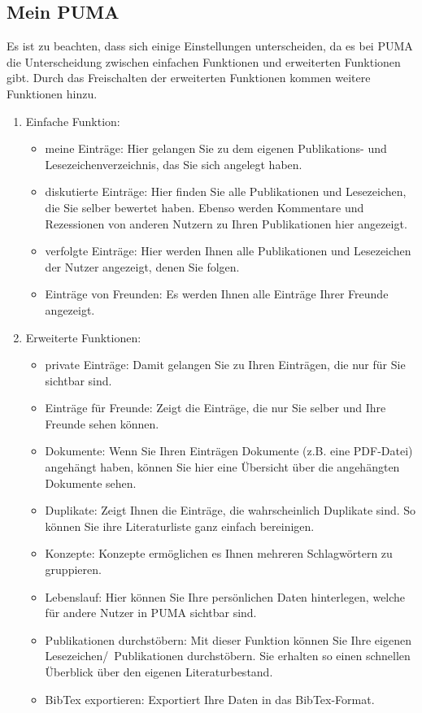 \subsection{Mein PUMA}
Es ist zu beachten, dass sich einige Einstellungen unterscheiden, da es bei PUMA die Unterscheidung zwischen einfachen Funktionen und erweiterten Funktionen gibt. Durch das Freischalten der erweiterten Funktionen kommen weitere Funktionen hinzu.
\begin{enumerate}
    \item Einfache Funktion:
    \begin{itemize}
        \item meine Einträge: Hier gelangen Sie zu dem eigenen Publikations- und Lesezeichenverzeichnis, das Sie sich angelegt haben.
        \item diskutierte Einträge: Hier finden Sie alle Publikationen und Lesezeichen, die Sie selber bewertet haben. Ebenso werden Kommentare und Rezessionen von anderen Nutzern zu Ihren Publikationen hier angezeigt.
        \item verfolgte Einträge: Hier werden Ihnen alle Publikationen und Lesezeichen der Nutzer angezeigt, denen Sie folgen.
        \item Einträge von Freunden: Es werden Ihnen alle Einträge Ihrer Freunde angezeigt.
    \end{itemize}
    \item Erweiterte Funktionen:
    \begin{itemize}
        \item private Einträge: Damit gelangen Sie zu Ihren Einträgen, die nur für Sie sichtbar sind. 
        \item Einträge für Freunde: Zeigt die Einträge, die nur Sie selber und Ihre Freunde sehen können.
        \item Dokumente: Wenn Sie Ihren Einträgen Dokumente (z.B. eine PDF-Datei) angehängt haben, können Sie hier eine Übersicht über die angehängten Dokumente sehen.
        \item Duplikate: Zeigt Ihnen die Einträge, die wahrscheinlich Duplikate sind. So können Sie ihre Literaturliste ganz einfach bereinigen. 
        \item Konzepte: Konzepte ermöglichen es Ihnen mehreren Schlagwörtern zu gruppieren. 
        \item Lebenslauf: Hier können Sie Ihre persönlichen Daten hinterlegen, welche für andere Nutzer in PUMA sichtbar sind.
        \item Publikationen durchstöbern: Mit dieser Funktion können Sie Ihre eigenen Lesezeichen/~Publikationen durchstöbern. Sie erhalten so einen schnellen Überblick über den eigenen Literaturbestand. 
        \item BibTex exportieren: Exportiert Ihre Daten in das BibTex-Format.
    \end{itemize}
\end{enumerate}
